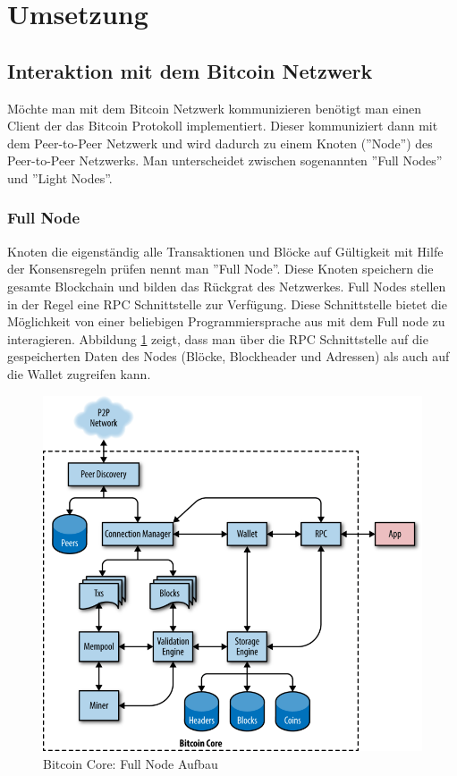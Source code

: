 \section{Umsetzung}

\subsection{Interaktion mit dem Bitcoin Netzwerk}

Möchte man mit dem Bitcoin Netzwerk kommunizieren benötigt man einen Client der das Bitcoin Protokoll implementiert. Dieser kommuniziert dann mit dem Peer-to-Peer Netzwerk und wird dadurch zu einem Knoten (''Node'') des Peer-to-Peer Netzwerks. Man unterscheidet zwischen sogenannten ''Full Nodes'' und ''Light Nodes''.
\subsubsection{Full Node}
Knoten die eigenständig alle Transaktionen und Blöcke auf Gültigkeit mit Hilfe der Konsensregeln prüfen nennt man ''Full Node''. Diese Knoten speichern die gesamte Blockchain und bilden das Rückgrat des Netzwerkes.
Full Nodes stellen in der Regel eine RPC Schnittstelle zur Verfügung. Diese Schnittstelle bietet die Möglichkeit von einer beliebigen Programmiersprache aus mit dem Full node zu interagieren.
Abbildung \ref{fig:btc_core_full_node_architecture}\cite{mastering_bitcoin} zeigt, dass man über die RPC Schnittstelle auf die gespeicherten Daten des Nodes (Blöcke, Blockheader und Adressen) als auch auf die Wallet zugreifen kann.

\begin{figure}[H]
\centering
\includegraphics[width=1\linewidth]{Figures/btc_core_full_node_architecture}
\decoRule
\caption{Bitcoin Core: Full Node Aufbau}
\label{fig:btc_core_full_node_architecture}
\end{figure}

